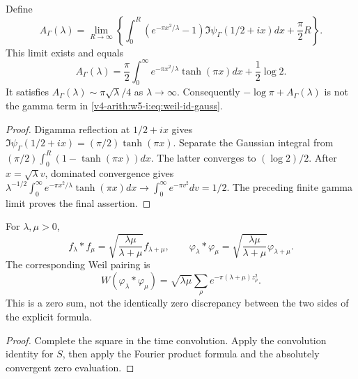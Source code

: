 \begin{proposition}
Define
\[
 A_\Gamma(\lambda)=\lim_{R\to\infty}
 \left\{\int_0^R(e^{-\pi x^2/\lambda}-1)
              \Im\psi_\Gamma(1/2+ix)dx+\frac\pi2 R\right\}.
\]
This limit exists and equals
\[
 A_\Gamma(\lambda)=\frac\pi2\int_0^\infty
                  e^{-\pi x^2/\lambda}\tanh(\pi x)dx
                  +\frac12\log2.
\]
It satisfies $A_\Gamma(\lambda)\sim\pi\sqrt\lambda/4$ as
$\lambda\to\infty$. Consequently $-\log\pi+A_\Gamma(\lambda)$
is not the gamma term in \eqref{v4-arith:w5-i:eq:weil-id-gauss}.
\end{proposition}
\begin{proof}
Digamma reflection at $1/2+ix$ gives
$\Im\psi_\Gamma(1/2+ix)=(\pi/2)\tanh(\pi x)$.
Separate the Gaussian integral from
$(\pi/2)\int_0^R(1-\tanh(\pi x))dx$.
The latter converges to $(\log2)/2$.
After $x=\sqrt\lambda v$, dominated convergence gives
$\lambda^{-1/2}\int_0^\infty e^{-\pi x^2/\lambda}
\tanh(\pi x)dx\to\int_0^\infty e^{-\pi v^2}dv=1/2$.
The preceding finite gamma limit proves the final assertion.
\end{proof}

\begin{proposition}
For $\lambda,\mu>0$,
\[
 f_\lambda*f_\mu=\sqrt{\frac{\lambda\mu}{\lambda+\mu}}
 f_{\lambda+\mu},\qquad
 \varphi_\lambda*\varphi_\mu
 =\sqrt{\frac{\lambda\mu}{\lambda+\mu}}\varphi_{\lambda+\mu}.
\]
The corresponding Weil pairing is
\[
 W(\varphi_\lambda*\varphi_\mu)
 =\sqrt{\lambda\mu}\sum_\rho e^{-\pi(\lambda+\mu)z_\rho^2}.
\]
This is a zero sum, not the identically zero discrepancy between the
two sides of the explicit formula.
\end{proposition}
\begin{proof}
Complete the square in the time convolution. Apply the convolution
identity for $S$, then apply the Fourier product formula and the
absolutely convergent zero evaluation.
\end{proof}
